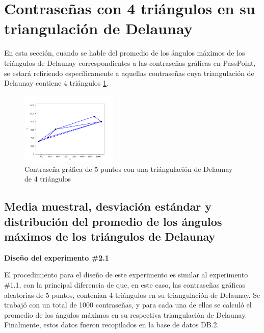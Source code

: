 \documentclass[12pt]{report}
\begin{document}
\section{Contraseñas con 4 triángulos en su triangulación de Delaunay }
En esta sección, cuando se hable del promedio de los ángulos máximos de los triángulos de Delaunay correspondientes a las contraseñas gráficas en PassPoint, se estará refiriendo específicamente a aquellas contraseñas cuya triangulación de Delaunay contiene 4 triángulos \ref{4TD}.

	\begin{figure}[ht]
	\centering
	
	\includegraphics[width=0.41\textwidth]{alea4td.png}
	\caption{Contraseña gráfica de 5 puntos con una triángulación de Delaunay de 4 triángulos}
	\label{4TD}
\end{figure}

\subsection{Media muestral, desviación estándar y distribución del promedio de los ángulos máximos de los triángulos de Delaunay }
\textbf{Diseño del experimento \#2.1}

El procedimiento para el diseño de este experimento es similar al experimento \#1.1, con la principal diferencia de que, en este caso, las contraseñas gráficas aleatorias de 5 puntos, contenían 4 triángulos en su triangulación de Delaunay. Se trabajó con un total de 1000 contraseñas, y para cada una de ellas se calculó el promedio de los ángulos máximos en su respectiva triangulación de Delaunay. Finalmente, estos datos fueron recopilados en la base de datos DB.2.

\end{document}

